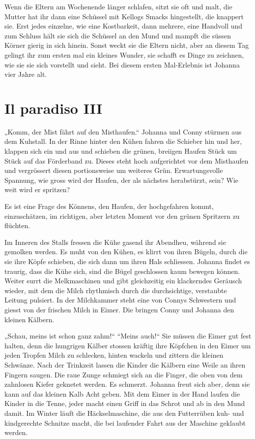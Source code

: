 \documentclass[10pt,titlepage,a5paper]{book}
\begin{document}
Wenn die Eltern am Wochenende länger schlafen, sitzt sie oft und malt, die Mutter hat ihr dann eine Schüssel mit Kellogs Smacks hingestellt, die knappert sie. Erst jedes einzelne, wie eine Kostbarkeit, dann mehrere, eine Handvoll und zum Schluss hält sie sich die Schüssel an den Mund und mampft die süssen Körner gierig in sich hinein. Sonst weckt sie die Eltern nicht, aber an diesem Tag gelingt ihr zum ersten mal ein kleines Wunder, sie schafft es Dinge zu zeichnen, wie sie sie sich vorstellt und sieht. Bei diesem ersten Mal-Erlebnis ist Johanna vier Jahre alt.



\section*{Il paradiso III}



„Komm, der Mist fährt auf den Misthaufen.“ Johanna und Conny stürmen aus dem Kuhstall. In der Rinne hinter den Kühen fahren die Schieber hin und her, klappen sich ein und aus und schieben die grünen, breiigen Haufen Stück um Stück auf das Förderband zu. Dieses steht hoch aufgerichtet vor dem Misthaufen und vergrössert diesen portionsweise um weiteres Grün.
Erwartungsvolle Spannung, wie gross wird der Haufen, der als nächstes herabstürzt, sein? Wie weit wird er spritzen?

Es ist eine Frage des Könnens, den Haufen, der hochgefahren kommt, einzuschätzen, im richtigen, aber letzten Moment vor den grünen Spritzern zu flüchten.

Im Inneren des Stalls fressen die Kühe gasend ihr Abendheu, während sie gemolken werden. Es muht von den Kühen, es klirrt von ihren Bügeln, durch die sie ihre Köpfe schieben, die sich dann um ihren Hals schliessen. Johanna findet es traurig, dass die Kühe sich, sind die Bügel geschlossen kaum bewegen können. Weiter surrt die Melkmaschinen und gibt gleichzeitig ein klackerndes Geräusch wieder, mit dem die Milch rhythmisch durch die durchsichtige, verstaubte Leitung pulsiert. In der Milchkammer steht eine von Connys Schwestern und giesst von der frischen Milch in Eimer. Die bringen Conny und Johanna den kleinen Kälbern. 

„Schau, meins ist schon ganz zahm!“ “Meins auch!“ Sie müssen die Eimer gut fest halten, denn die hungrigen Kälber stossen kräftig ihre Köpfchen in den Eimer um jeden Tropfen Milch zu schlecken, hinten wackeln und zittern die kleinen Schwänze. Nach der Trinkzeit lassen die Kinder die Kälbern eine Weile an ihren Fingern saugen. Die raue Zunge schmiegt sich an die Finger, die oben von dem zahnlosen Kiefer geknetet werden. Es schmerzt. Johanna freut sich aber, denn sie kann auf  das kleinen Kalb Acht geben. Mit dem Eimer in der Hand laufen die Kinder in die Tenne, jeder macht einen Griff in das Schrot und ab in den Mund damit. Im Winter läuft die Häckselmaschine, die aus den Futterrüben kuh- und kindgerechte Schnitze macht, die bei laufender Fahrt aus der Maschine geklaubt werden.
\end{document}

